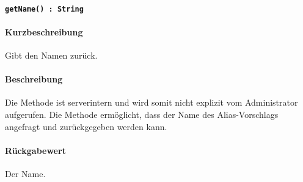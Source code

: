 \paragraph{\texttt{getName() : String}}%
\paragraph*{Kurzbeschreibung}
Gibt den Namen zurück.
\paragraph*{Beschreibung}
Die Methode ist serverintern und wird somit nicht explizit vom Administrator aufgerufen.
Die Methode ermöglicht, dass der Name des Alias-Vorschlags angefragt und zurückgegeben werden kann.
\paragraph*{Rückgabewert}
Der Name.
